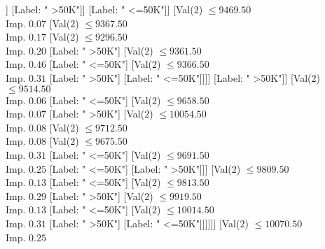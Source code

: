 \documentclass[margin=10pt]{standalone}
\begin{document}
\begin{forest}
																													[Label: " <=50K"]]
																												[Label: " >50K"]]
																											[Label: " <=50K"]]
																										[Val($2$) $ \leq 9469.50$ \\ Imp. $0.07$
																											[Val($2$) $ \leq 9367.50$ \\ Imp. $0.17$
																												[Val($2$) $ \leq 9296.50$ \\ Imp. $0.20$
																													[Label: " >50K"]
																													[Val($2$) $ \leq 9361.50$ \\ Imp. $0.46$
																														[Label: " <=50K"]
																														[Val($2$) $ \leq 9366.50$ \\ Imp. $0.31$
																															[Label: " >50K"]
																															[Label: " <=50K"]]]]
																												[Label: " >50K"]]
																											[Val($2$) $ \leq 9514.50$ \\ Imp. $0.06$
																												[Label: " <=50K"]
																												[Val($2$) $ \leq 9658.50$ \\ Imp. $0.07$
																													[Label: " >50K"]
																													[Val($2$) $ \leq 10054.50$ \\ Imp. $0.08$
																														[Val($2$) $ \leq 9712.50$ \\ Imp. $0.08$
																															[Val($2$) $ \leq 9675.50$ \\ Imp. $0.31$
																																[Label: " <=50K"]
																																[Val($2$) $ \leq 9691.50$ \\ Imp. $0.25$
																																	[Label: " <=50K"]
																																	[Label: " >50K"]]]
																															[Val($2$) $ \leq 9809.50$ \\ Imp. $0.13$
																																[Label: " <=50K"]
																																[Val($2$) $ \leq 9813.50$ \\ Imp. $0.29$
																																	[Label: " >50K"]
																																	[Val($2$) $ \leq 9919.50$ \\ Imp. $0.13$
																																		[Label: " <=50K"]
																																		[Val($2$) $ \leq 10014.50$ \\ Imp. $0.31$
																																			[Label: " >50K"]
																																			[Label: " <=50K"]]]]]]
																														[Val($2$) $ \leq 10070.50$ \\ Imp. $0.25$

\end{forest}
\end{document}

